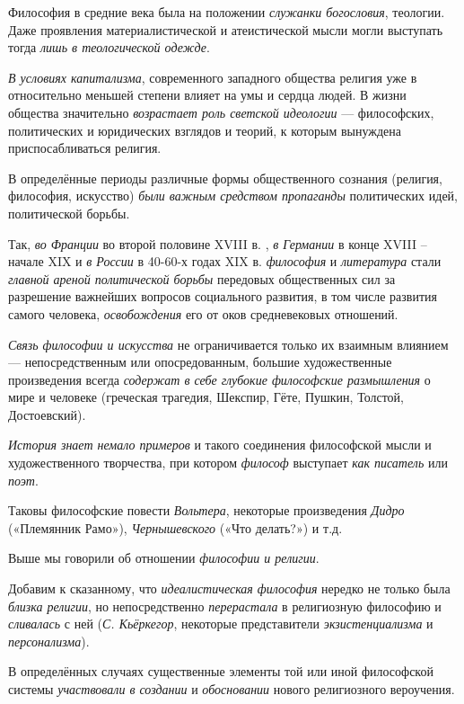 \documentclass[a4paper,14pt,russian]{extreport}
\begin{document}
Философия в средние века была на положении \emph{служанки богословия}, теологии. Даже проявления материалистической и атеистической мысли могли выступать тогда \emph{лишь в теологической одежде}.

\emph{В условиях капитализма}, современного западного общества религия уже в относительно меньшей степени влияет на умы и сердца людей. В жизни общества значительно \emph{возрастает роль светской идеологии} --- философских, политических и юридических взглядов и теорий, к которым вынуждена приспосабливаться религия.

В определённые периоды различные формы общественного сознания (религия, философия, искусство) \emph{были важным средством пропаганды} политических идей, политической борьбы.

Так, \emph{во Франции} во второй половине XVIII в\textsc{.} , \emph{в Германии} в конце XVIII -- начале XIX и \emph{в России} в 40-60-х годах XIX в. \emph{философия} и \emph{литература} стали \emph{главной ареной политической борьбы} передовых общественных сил за разрешение важнейших вопросов социального развития, в том числе развития самого человека, \emph{освобождения} его от оков средневековых отношений.

\emph{Связь философии и искусства} не ограничивается только их взаимным влиянием --- непосредственным или опосредованным, большие художественные произведения всегда \emph{содержат в себе глубокие философские размышления} о мире и человеке (греческая трагедия, Шекспир, Гёте, Пушкин, Толстой, Достоевский).

\emph{История знает немало примеров} и такого соединения философской мысли и художественного творчества, при котором \emph{философ} выступает \emph{как писатель} или \emph{поэт}.

Таковы философские повести \emph{Вольтера}, некоторые произведения \emph{Дидро} («Племянник Рамо»), \emph{Чернышевского} («Что делать?») и т.д.

Выше мы говорили об отношении \emph{философии и религии}.

Добавим к сказанному, что \emph{идеалистическая философия} нередко не только была \emph{близка религии}, но непосредственно \emph{перерастала} в религиозную философию и \emph{сливалась} с ней (\emph{С. Кьёркегор}, некоторые представители \emph{экзистенциализма} и \emph{персонализма}).

В определённых случаях существенные элементы той или иной философской системы \emph{участвовали в создании} и \emph{обосновании} нового религиозного вероучения.
\end{document}
